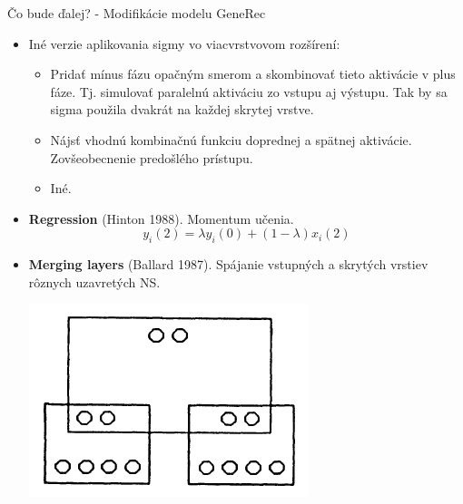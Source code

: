 \documentclass[xcolor=dvipsnames]{beamer}
\begin{document}
\begin{frame}{Čo bude ďalej? - Modifikácie modelu GeneRec}
  \begin{itemize}
    \item Iné verzie aplikovania sigmy vo viacvrstvovom rozšírení: 
    \begin{itemize}
      \item Pridať mínus fázu opačným smerom a skombinovať tieto aktivácie v plus fáze. Tj. simulovať paralelnú aktiváciu zo vstupu aj výstupu. Tak by sa sigma použila dvakrát na každej skrytej vrstve. 
      \item Nájsť vhodnú kombinačnú funkciu doprednej a spätnej aktivácie. Zovšeobecnenie predošlého prístupu.
      \item Iné. 
    \end{itemize} 
    \item \textbf{Regression} (Hinton 1988). Momentum učenia. 
    $$y_i(2) = \lambda y_i(0) + (1-\lambda)x_i(2)$$
    \item \textbf{Merging layers} (Ballard 1987). Spájanie vstupných a skrytých vrstiev rôznych uzavretých NS. \\
    \begin{center}
      \includegraphics[scale=0.3]{img/ballard.png}
    \end{center} 
  \end{itemize}
\end{frame}
\end{document}
